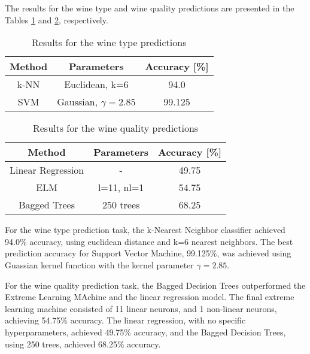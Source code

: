 The results for the wine type and wine quality predictions are presented in the Tables \ref{tab:type-results} and \ref{tab:quality-results}, respectively.

\begin{table}[H]
  \caption{Results for the wine type predictions}
  \centering
  \begin{tabular*}{0.48\textwidth}{c|c|c}
    \textbf{Method} & \textbf{Parameters} & \textbf{Accuracy [\%]} \\
    \midrule
    k-NN & Euclidean, k=6 & 94.0 \\
    SVM  & Gaussian, $\gamma=2.85$ & 99.125 \\
  \end{tabular*}
  \label{tab:type-results}
\end{table}

\begin{table}[H]
  \caption{Results for the wine quality predictions}
  \centering
  \begin{tabular*}{0.48\textwidth}{c|c|c}
    \textbf{Method} & \textbf{Parameters} & \textbf{Accuracy [\%]} \\
    \midrule
    Linear Regression & - & 49.75 \\
    ELM & l=11, nl=1 & 54.75 \\
    Bagged Trees & 250 trees & 68.25 \\
  \end{tabular*}
  \label{tab:quality-results}
\end{table}


For the wine type prediction task, the k-Nearest Neighbor classifier achieved 94.0\% accuracy, using euclidean distance and k=6 nearest neighbors. The best prediction accuracy for Support Vector Machine, 99.125\%, was achieved using Guassian kernel function with the kernel parameter $\gamma=2.85$.

For the wine quality prediction task, the Bagged Decision Trees outperformed the Extreme Learning MAchine and the linear regression model. The final extreme learning machine consisted of 11 linear neurons, and 1 non-linear neurons, achieving 54.75\% accuracy. The linear regression, with no specific hyperparameters, achieved 49.75\% accuracy, and the Bagged Decision Trees, using 250 trees, achieved 68.25\% accuracy.




